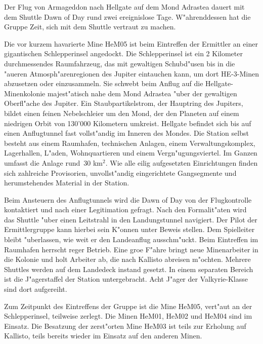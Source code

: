 {}

Der Flug von Armageddon nach Hellgate auf dem Mond Adrastea dauert mit dem Shuttle Dawn of Day rund zwei ereignislose Tage. W"ahrenddessen hat die Gruppe Zeit, sich mit dem Shuttle vertraut zu machen.

Die vor kurzem havarierte Mine HeM05 ist beim Eintreffen der Ermittler an einer gigantischen Schlepperinsel angedockt. Die Schlepperinsel ist ein 2 Kilometer durchmessendes Raumfahrzeug, das mit gewaltigen Schubd"usen bis in die "au\3eren Atmosph"arenregionen des Jupiter eintauchen kann, um dort HE-3-Minen abzusetzen oder einzusammeln. Sie schwebt beim Anflug auf die Hellgate-Minenkolonie majest"atisch nahe dem Mond Adrastea "uber der gewaltigen Oberfl"ache des Jupiter. Ein Staubpartikelstrom, der Hauptring des Jupiters, bildet einen feinen Nebelschleier um den Mond, der den Planeten auf einem niedrigen Orbit von 130'000 Kilometern umkreist. Hellgate befindet sich bis auf einen Anflugtunnel fast vollst"andig im Inneren des Mondes. Die Station selbst besteht aus einem Raumhafen, technischen Anlagen, einem Verwaltungskomplex, Lagerhallen, L"aden, Wohnquartieren und einem Vergn"ugungsviertel. Im Ganzen umfasst die Anlage rund~30 km$^{2}$. Wie alle eilig aufgesetzten Einrichtungen finden sich zahlreiche Provisorien, unvollst"andig eingerichtete Gangsegmente und herumstehendes Material in der Station.

Beim Ansteuern des Anflugtunnels wird die Dawn of Day von der Flugkontrolle kontaktiert und nach einer Legitimation gefragt. Nach den Formalit"aten wird das Shuttle "uber einen Leitstrahl in den Landungstunnel navigiert. Der Pilot der Ermittlergruppe kann hierbei sein K"onnen unter Beweis stellen. Dem Spielleiter bleibt "uberlassen, wie weit er den Landeanflug ausschm"uckt. Beim Eintreffen im Raumhafen herrscht reger Betrieb. Eine gro\3e F"ahre bringt neue Minenarbeiter in die Kolonie und holt Arbeiter ab, die nach Kallisto abreisen m"ochten. Mehrere Shuttles werden auf dem Landedeck instand gesetzt. In einem separaten Bereich ist die J"agerstaffel der Station untergebracht. Acht J"ager der Valkyrie-Klasse sind dort aufgereiht.

Zum Zeitpunkt des Eintreffens der Gruppe ist die Mine HeM05, vert"aut an der Schlepperinsel, teilweise zerlegt. Die Minen HeM01, HeM02 und HeM04 sind im Einsatz. Die Besatzung der zerst"orten Mine HeM03 ist teils zur Erholung auf Kallisto, teils bereits wieder im Einsatz auf den anderen Minen.

